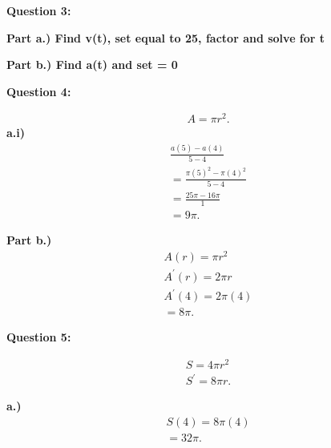 \documentclass{report}
\begin{document}
    \bigbreak \noindent \bigbreak \noindent 
    \begin{Large}
        \textbf{Question 3:}
    \end{Large}
    \bigbreak \noindent 
    \bigbreak \noindent 
    \textbf{Part a.) Find v(t), set equal to 25, factor and solve for t}
    \bigbreak \noindent 

    \bigbreak \noindent 
    \textbf{Part b.) Find a(t) and set = 0 }
    \bigbreak \noindent 

    \bigbreak \noindent \bigbreak \noindent 
    \begin{Large}
        \textbf{Question 4:}
    \end{Large}
    \bigbreak \noindent 
    \bigbreak \noindent 
    \begin{align*}
      A = \pi r^{2}
    .\end{align*}
    \bigbreak \noindent 
    \textbf{a.i)}
    \begin{align*}
        \frac{a(5)-  a(4)}{5-4} \\
        = \frac{\pi (5)^{2} - \pi(4)^{2}}{5-4} \\ 
        = \frac{25\pi - 16\pi}{1} \\
        = \boxed{9\pi}
    .\end{align*}

    \bigbreak \noindent 
    \textbf{Part b.)}
    \begin{align*}
      A(r) = \pi r^{2} \\
      A^{\prime}(r) = 2\pi r \\
      A^{\prime}(4) = 2 \pi(4) \\ 
      = \boxed{8\pi}
    .\end{align*}

    \bigbreak \noindent \bigbreak \noindent 
    \begin{Large}
        \textbf{Question 5:}
    \end{Large}
    \bigbreak \noindent 
    \bigbreak \noindent 
    \begin{align*}
      S = 4\pi r^{2} \\ 
      S^{\prime} = 8\pi r 
    .\end{align*}

    \bigbreak \noindent 
    \textbf{a.)}
    \begin{align*}
      S(4) = 8\pi(4) \\ 
      = 32\pi
    .\end{align*}
\end{document}
